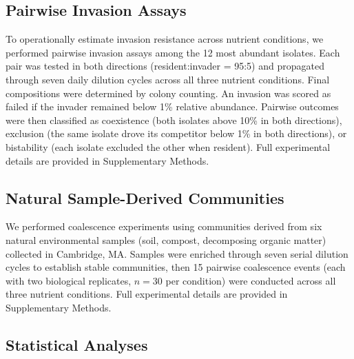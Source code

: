 \subsection*{Pairwise Invasion Assays}
\label{sec:methods:invasion}

To operationally estimate invasion resistance across nutrient conditions, we performed pairwise invasion assays among the 12 most abundant isolates. Each pair was tested in both directions (resident:invader = 95:5) and propagated through seven daily dilution cycles across all three nutrient conditions. Final compositions were determined by colony counting. An invasion was scored as failed if the invader remained below 1\% relative abundance. Pairwise outcomes were then classified as coexistence (both isolates above 10\% in both directions), exclusion (the same isolate drove its competitor below 1\% in both directions), or bistability (each isolate excluded the other when resident).  Full experimental details are provided in Supplementary Methods.



\subsection*{Natural Sample-Derived Communities}
\label{sec:methods:natural}

We performed coalescence experiments using communities derived from six natural environmental samples (soil, compost, decomposing organic matter) collected in Cambridge, MA.  Samples were enriched through seven serial dilution cycles to establish stable communities, then 15 pairwise coalescence events (each with two biological replicates, $n = 30$ per condition) were conducted across all three nutrient conditions. Full experimental details are provided in Supplementary Methods.


\subsection*{Statistical Analyses}
\label{sec:methods:statistics}

